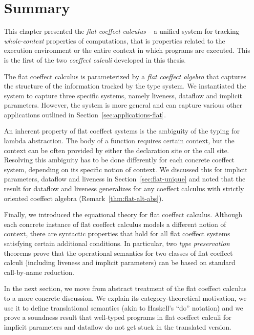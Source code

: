 %
%
\section{Summary}

This chapter presented the \emph{flat coeffect calculus} -- a unified system for tracking
\emph{whole-context} properties of computations, that is properties related to the
execution environment or the entire context in which programs are executed.
This is the first of the two \emph{coeffect calculi} developed in this thesis.

The flat coeffect calculus is parameterized by a \emph{flat coeffect algebra} that captures
the structure of the information tracked by the type system. We instantiated the system to
capture three specific systems, namely liveness, dataflow and implicit parameters. However,
the system is more general and can capture various other applications outlined in
Section~\ref{sec:applications-flat}.

An inherent property of flat coeffect systems is the ambiguity of the typing for lambda
abstraction. The body of a function requires certain context, but the context can be often
provided by either the declaration site or the call site. Resolving this ambiguity has to be
done differently for each concrete coeffect system, depending on its specific notion of context.
We discussed this for implicit parameters, dataflow and liveness in Section~\ref{sec:flat-unique}
and noted that the result for dataflow and liveness generalizes for any coeffect calculus
with strictly oriented coeffect algebra (Remark~\ref{thm:flat-alt-abs}).

Finally, we introduced the equational theory for flat coeffect calculus. Although each
concrete instance of flat coeffect calculus models a different notion of context, there are
syntactic properties that hold for all flat coeffect systems satisfying certain additional
conditions. In particular, two \emph{type preservation} theorems prove that the operational
semantics for two classes of flat coeffect calculi (including liveness and implicit parameters)
can be based on standard call-by-name reduction.

In the next section, we move from abstract treatment of the flat coeffect calculus to a more
concrete discussion. We explain its category-theoretical motivation, we use it to define
translational semantics (akin to Haskell's ``do'' notation) and we prove a soundness result that
well-typed programs in flat coeffect calculi for implicit parameters and dataflow do not get
stuck in the translated version.
